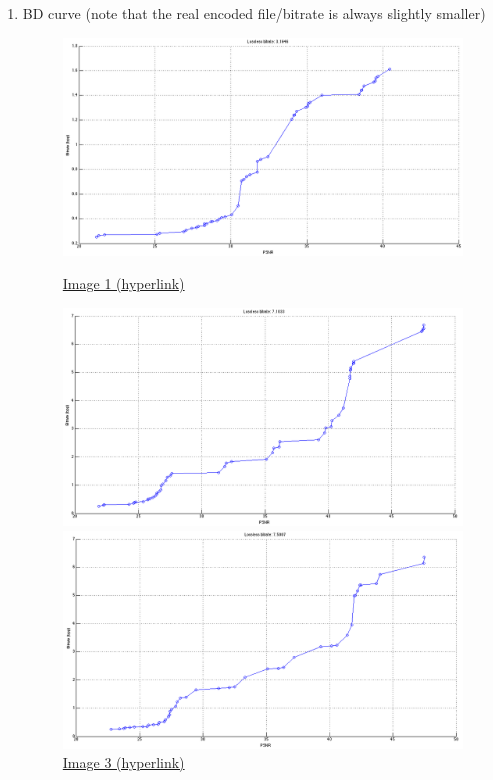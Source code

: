 \documentclass[12pt]{article}
\begin{document}
\begin{enumerate}
	\newpage
	\item BD curve (note that the real encoded file/bitrate is always slightly smaller)
		\begin{figure}[ht]
			\hspace{-5em}
			\begin{minipage}[c]{0.6\linewidth}
				\centering
				\includegraphics[scale=.28]{./res/BD_curve/BD1.png}
				\caption*{\href{https://github.com/HW-Lee/ImageCodec/blob/master/results/1_1536x1024/original.png}{Image 1 (hyperlink)}}
				\includegraphics[scale=.28]{./res/BD_curve/BD3.png}
				\caption*{\href{https://github.com/HW-Lee/ImageCodec/blob/master/results/3_1000x728/original.png}{Image 3 (hyperlink)}}
			\end{minipage}
			\hspace{0.5em}
			\begin{minipage}[c]{0.6\linewidth}
				\centering
				\includegraphics[scale=.28]{./res/BD_curve/BD2.png}

\end{minipage}
\end{figure}
\end{enumerate}
\end{document}
